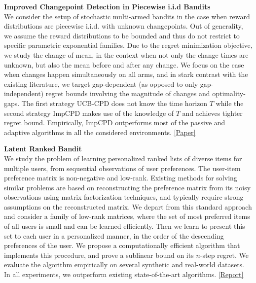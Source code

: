 \documentclass[margin,11pt]{res}
\begin{document}
\begin{resume}
\textbf{Improved Changepoint Detection in Piecewise i.i.d  Bandits}\\
We consider the setup of stochastic multi-armed bandits in the case when reward distributions are piecewise i.i.d. with unknown changepoints. Out of generality, we assume the reward distributions to be bounded and thus do not restrict to specific parametric exponential families. Due to the regret minimization objective, we study the change of mean, in the context when not only the change times are unknown, but also the mean before and after any change. We focus on the case when changes happen simultaneously on all arms, and in stark contrast with the existing literature, we target gap-dependent (as opposed to only gap-independent) regret bounds involving the magnitude of changes and optimality-gaps. The first strategy UCB-CPD does not know the time horizon $T$ while the second strategy ImpCPD makes use of the knowledge of $T$ and achieves tighter regret bound. Empirically, ImpCPD outperforms most of the passive and adaptive algorithms in all the considered environments. \href{https://subhojyoti.github.io/pdf/aistats_2019.pdf}{[Paper]}

%

\textbf{Latent Ranked Bandit}\\
We study the problem of learning personalized ranked lists of diverse items for multiple users, from sequential observations of user preferences. The user-item preference matrix is non-negative and low-rank. Existing methods for solving similar problems are based on reconstructing the preference matrix from its noisy observations using matrix factorization techniques, and typically require strong assumptions on the reconstructed matrix. We depart from this standard approach and consider a family of low-rank matrices, where the set of most preferred items of all users is small and can be learned efficiently. Then we learn to present this set to each user in a personalized manner, in the order of the descending preferences of the user. We propose a computationally efficient algorithm that implements this procedure, and prove a sublinear bound on its $n$-step regret. We evaluate the algorithm empirically on several synthetic and real-world datasets. In all experiments, we outperform existing state-of-the-art algorithms. \href{https://subhojyoti.github.io/pdf/paper.pdf}{[Report]}


\end{resume}
\end{document}
